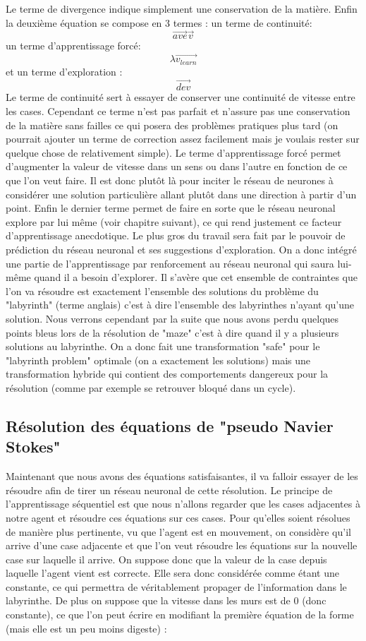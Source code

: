 \documentclass[10pt]{article}
\begin{document}
Le terme de divergence indique simplement une conservation de la matière. Enfin la deuxième équation se compose en 3 termes : un terme de continuité: 
\[\overrightarrow{ave}\overrightarrow{v}\]
un terme d'apprentissage forcé:
\[\lambda\overrightarrow{v_{learn}}\]
et un terme d'exploration :
\[\overrightarrow{dev}\]
Le terme de continuité sert à essayer de conserver une continuité de vitesse entre les cases. Cependant ce terme n'est pas parfait et n'assure pas une conservation de la matière sans failles ce qui posera des problèmes pratiques plus tard (on pourrait ajouter un terme de correction assez facilement mais je voulais rester sur quelque chose de relativement simple). Le terme d'apprentissage forcé permet d'augmenter la valeur de vitesse dans un sens ou dans l'autre en fonction de ce que l'on veut faire. Il est donc plutôt là pour inciter le réseau de neurones à considérer une solution particulière allant plutôt dans une direction à partir d'un point. Enfin le dernier terme permet de faire en sorte que le réseau neuronal explore par lui même (voir chapitre suivant), ce qui rend justement ce facteur d'apprentissage anecdotique. Le plus gros du travail sera fait par le pouvoir de prédiction du réseau neuronal et ses suggestions d'exploration. On a donc intégré une partie de l'apprentissage par renforcement au réseau neuronal qui saura lui-même quand il a besoin d'explorer.
Il s'avère que cet ensemble de contraintes que l'on va résoudre est exactement l'ensemble des solutions du problème du "labyrinth" (terme anglais) c'est à dire l'ensemble des labyrinthes n'ayant qu'une solution. Nous verrons cependant par la suite que nous avons perdu quelques points bleus lors de la résolution de "maze" c'est à dire quand il y a plusieurs solutions au labyrinthe. On a donc fait une transformation "safe" pour le "labyrinth problem" optimale (on a exactement les solutions) mais une transformation hybride qui contient des comportements dangereux pour la résolution (comme par exemple se retrouver bloqué dans un cycle).

\subsection{Résolution des équations de "pseudo Navier Stokes"}
Maintenant que nous avons des équations satisfaisantes, il va falloir essayer de les résoudre afin de tirer un réseau neuronal de cette résolution. Le principe de l'apprentissage séquentiel est que nous n'allons regarder que les cases adjacentes à notre agent et résoudre ces équations sur ces cases. Pour qu'elles soient résolues de manière plus pertinente, vu que l'agent est en mouvement, on considère qu'il arrive d'une case adjacente et que l'on veut résoudre les équations sur la nouvelle case sur laquelle il arrive. On suppose donc que la valeur de la case depuis laquelle l'agent vient est correcte. Elle sera donc considérée comme étant une constante, ce qui permettra de véritablement propager de l'information dans le labyrinthe. De plus on suppose que la vitesse dans les murs est de 0 (donc constante), ce que l'on peut écrire en modifiant la première équation de la forme (mais elle est un peu moins digeste) :
\end{document}

